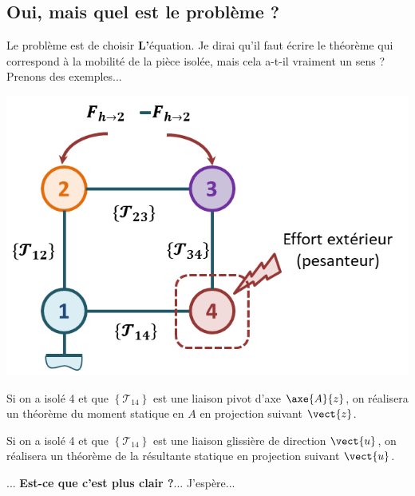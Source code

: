 \subsection{Oui, mais quel est le problème ?}

Le problème est de choisir \textbf{\large{L'}}\normalsize équation. Je dirai qu'il faut écrire le théorème qui correspond à la mobilité de la pièce isolée, mais cela a-t-il vraiment un sens ? Prenons des exemples...

\begin{minipage}[c]{.4\linewidth}
\begin{center}
\includegraphics[width=\linewidth]{images/fig_04}
\end{center}
\end{minipage}
\hfill
\begin{minipage}[c]{.55\linewidth}
Si on a isolé 4 et que  $\left\{\mathcal{T}_{14}\right\}$ est une liaison pivot d'axe $\axe{A}{z}$, on réalisera un théorème du moment statique en $A$ en projection suivant $\vect{z}$.

Si on a isolé 4 et que  $\left\{\mathcal{T}_{14}\right\}$ est une liaison glissière de direction $\vect{u}$, on réalisera un théorème de la résultante statique en projection suivant $\vect{u}$.

... \textbf{Est-ce que c'est plus clair ?}... J'espère...

\end{minipage}



